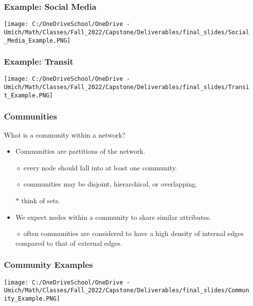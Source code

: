 \documentclass{beamer}
\begin{document}
\begin{frame}

    \frametitle{Example: Social Media}
    \texttt{[image: C:/OneDriveSchool/OneDrive - Umich/Math/Classes/Fall\_2022/Capstone/Deliverables/final\_slides/Social\_Media\_Example.PNG]}

\end{frame}

\begin{frame}

    \frametitle{Example: Transit}
    \texttt{[image: C:/OneDriveSchool/OneDrive - Umich/Math/Classes/Fall\_2022/Capstone/Deliverables/final\_slides/Transit\_Example.PNG]}

\end{frame}


\begin{frame}

    \frametitle{Communities}

    What is a community within a network?\pause

    \vspace{2.5mm}
    \begin{itemize}
        \item Communities are partitions of the network.\pause
        \item[$\diamond$] every node should fall into at least one community.\pause
        \item[$\diamond$] communities may be disjoint, hierarchical, or overlapping.\pause
        \item[$\ast$] think of sets.\pause
        \item We expect nodes within a community to share similar attributes.\pause
        \item[$\diamond$] often communities are considered to have a high density of internal edges compared to that of external edges. 
    \end{itemize}

\end{frame}

\begin{frame}

    \frametitle{Community Examples}
    \texttt{[image: C:/OneDriveSchool/OneDrive - Umich/Math/Classes/Fall\_2022/Capstone/Deliverables/final\_slides/Community\_Example.PNG]}

\end{frame}
\end{document}
